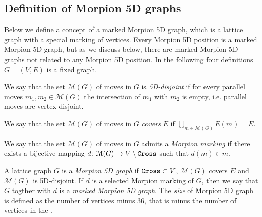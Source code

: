 
\subsection{Definition of Morpion 5D graphs}

Below we define a concept of a marked Morpion 5D graph, which is a lattice graph with a special marking of vertices. Every Morpion 5D position is a marked Morpion 5D graph, but as we discuss below, there are marked Morpion 5D graphs not related to any Morpion 5D position.
In the following 
four definitions  $G = (V, E)$ is a fixed graph. 

\begin{definition} 
We say that the set $\mathcal{M}(G)$ of moves in $G$ is \emph{5D-disjoint}
if for every parallel moves $m_1, m_2 \in \mathcal{M}(G)$ the intersection of $m_1$ with $m_2$ is empty, i.e. parallel moves are vertex disjoint.
\end{definition}

\begin{definition} 
We say that the set $\mathcal{M}(G)$ of moves in $G$ \emph{covers} $E$ if 
  $\bigcup_{m \in \mathcal{M}(G)} E(m) = E$.
\end{definition}

\begin{definition}
  We say that the set $\mathcal{M}(G)$ of moves in $G$ admits a \emph{Morpion marking} if
     there exists a bijective mapping $d \colon \mathcal{M}(G) \to V \setminus \texttt{Cross}$ such that $d(m) \in m$.
\end{definition}

\begin{definition}
  A lattice graph $G$ is a \emph{Morpion 5D graph} if $\texttt{Cross} \subset V$,
    $\mathcal{M}(G)$ covers $E$ and $\mathcal{M}(G)$ is 5D-disjoint.
  If $d$ is a selected Morpion marking of $G$, then we say that $G$ togther with $d$ is 
    a \emph{marked Morpion 5D graph}.
  The \emph{size} of Morpion 5D graph  is defined as the number of vertices minus $36$, that is minus the number of vertices in the \Cross.
 \end{definition}


